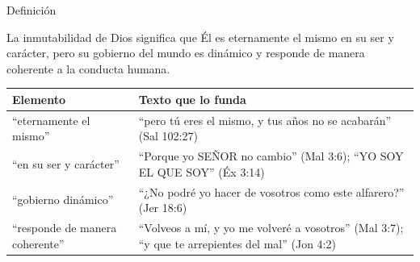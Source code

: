\documentclass[hyperref={bookmarks=false},aspectratio=169]{beamer}
\newcommand{\SENOR}{S{\fontsize{0.78em}{1em}\selectfont EÑOR}}
\begin{document}
\begin{frame}{Definición}
\begin{tcolorbox}[colback=papiro,colframe=azul,boxrule=1pt,arc=3pt,title={\small Definición teológica bíblica},colbacktitle=azul,coltitle=papiro]
\small La inmutabilidad de Dios significa que Él es eternamente el mismo en su ser y carácter, pero su gobierno del mundo es dinámico y responde de manera coherente a la conducta humana.
\end{tcolorbox}
\scriptsize\renewcommand{\arraystretch}{1.18}
\begin{tabular}{@{}>{\RaggedRight\arraybackslash}p{3.0cm}>{\RaggedRight\arraybackslash}p{8.8cm}@{}}
\toprule
\textbf{Elemento} & \textbf{Texto que lo funda} \\ \midrule
``eternamente el mismo'' & ``pero tú eres el mismo, y tus años no se acabarán'' (Sal 102:27) \\
``en su ser y carácter'' & ``Porque yo \SENOR{} no cambio'' (Mal 3:6); ``YO SOY EL QUE SOY'' (Éx 3:14) \\
``gobierno dinámico'' & ``¿No podré yo hacer de vosotros como este alfarero?'' (Jer 18:6) \\
``responde de manera coherente'' & ``Volveos a mí, y yo me volveré a vosotros'' (Mal 3:7); ``y que te arrepientes del mal'' (Jon 4:2) \\
\bottomrule
\end{tabular}
\end{frame}
\end{document}
